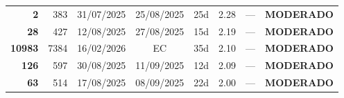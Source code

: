 \documentclass[a4paper,10pt]{article}
\begin{document}
\begin{center}
\begin{longtable}{>{\scriptsize}r>{\scriptsize}r>{\scriptsize}c>{\scriptsize}c>{\scriptsize}r>{\scriptsize}r>{\scriptsize}r>{\scriptsize}l}
\textcolor{anomyellow}{\textbf{2}} & 383 & 31/07/2025 & 25/08/2025 & 25d & \textcolor{anomyellow}{2.28} & --- & \textcolor{anomyellow}{\textbf{MODERADO}} \\

\textcolor{anomyellow}{\textbf{28}} & 427 & 12/08/2025 & 27/08/2025 & 15d & \textcolor{anomyellow}{2.19} & --- & \textcolor{anomyellow}{\textbf{MODERADO}} \\

\textcolor{anomyellow}{\textbf{10983}} & 7384 & 16/02/2026 & \textcolor{anomorange}{EC} & 35d & \textcolor{anomyellow}{2.10} & --- & \textcolor{anomyellow}{\textbf{MODERADO}} \\

\textcolor{anomyellow}{\textbf{126}} & 597 & 30/08/2025 & 11/09/2025 & 12d & \textcolor{anomyellow}{2.09} & --- & \textcolor{anomyellow}{\textbf{MODERADO}} \\

\textcolor{anomyellow}{\textbf{63}} & 514 & 17/08/2025 & 08/09/2025 & 22d & \textcolor{anomyellow}{2.00} & --- & \textcolor{anomyellow}{\textbf{MODERADO}} \\

\end{longtable}\end{center}
\end{document}
